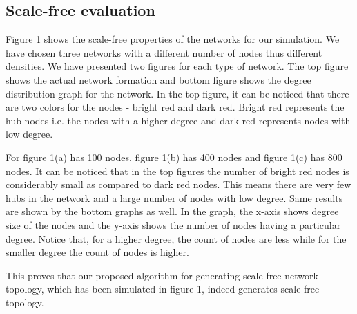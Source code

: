 \documentclass{article}
\begin{document}
	\subsection{Scale-free evaluation}
	Figure 1 shows the scale-free properties of the networks for our simulation. We have chosen three networks with a different number of nodes thus different densities. We have presented two figures for each type of network. The top figure shows the actual network formation and bottom figure shows the degree distribution graph for the network. In the top figure, it can be noticed that there are two colors for the nodes - bright red and dark red. Bright red represents the hub nodes i.e. the nodes with a higher degree and dark red represents nodes with low degree. 
	
	For figure 1(a) has 100 nodes, figure 1(b) has 400 nodes and figure 1(c) has 800 nodes. It can be noticed that in the top figures the number of bright red nodes is considerably small as compared to dark red nodes. This means there are very few hubs in the network and a large number of nodes with low degree. Same results are shown by the bottom graphs as well. In the graph, the x-axis shows degree size of the nodes and the y-axis shows the number of nodes having a particular degree. Notice that, for a higher degree, the count of nodes are less while for the smaller degree the count of nodes is higher.
	
	This proves that our proposed algorithm for generating scale-free network topology, which has been simulated in figure 1, indeed generates scale-free topology.
	
\end{document}
